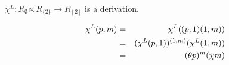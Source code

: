 \begin{lem}
$\chi^{L} : R_{\emptyset} \ltimes R_{\{2\}} \to R_{[2]}$ is a derivation.
\end{lem}
\begin{pf}
\begin{eqnarray*}
\chi^{L}(p,m) 
  & = &  \chi^{L}((p,1)(1,m)) \\
  & = &  (\chi^{L}(p,1))^{(1,m)} (\chi^{L}(1,m)) \\
  & = &  (\theta p)^{m} (\ddot{\chi} m)
\end{eqnarray*}
\end{pf}

